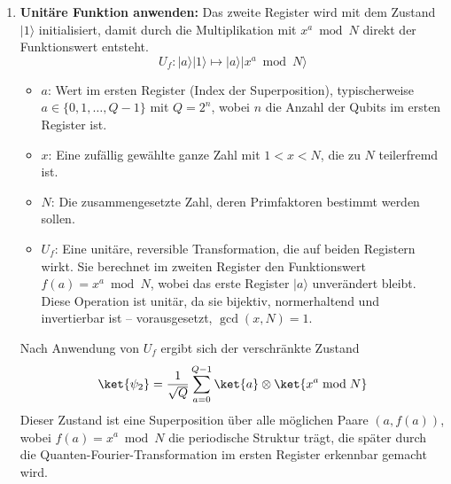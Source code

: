 {\begin{enumerate}
$$
\ket{\psi_1} = \frac{1}{\sqrt{Q}} \sum_{a=0}^{Q-1} \ket{a}
$$
Dabei ist:
  \begin{itemize}
    \item \( n \): Anzahl der Qubits im ersten Register.
    \item \( Q = 2^n \): Anzahl der möglichen Zustände im ersten Register
    \item \( a \): Laufvariable über alle Basiszustände von \( \ket{0} \) bis \( \ket{Q-1} \).
    \item \( 1 \): Anfangszustand des zweiten Registers, auf das später die modulare Exponentiation angewendet wird.
  \end{itemize}

  Durch die Hadamard-Gates wird das Register in eine Superposition gebracht, in der alle \( Q \) Basiszustände gleichwahrscheinlich sind. Diese Superposition ist notwendig, um später durch die Phaseninterferenz Information über die Periode der Funktion zu extrahieren.\\
 \item \textbf{Unitäre Funktion anwenden:} 
  Das zweite Register wird mit dem Zustand \( |1\rangle \) initialisiert, damit durch die Multiplikation mit \( x^a \bmod N \) direkt der Funktionswert entsteht.
\[
U_f \colon |a\rangle|1\rangle \mapsto |a\rangle|x^a \bmod N\rangle
\]
\begin{itemize}
    \item \textbf{\( a \)}: Wert im ersten Register (Index der Superposition), typischerweise \( a \in \{0, 1, \dotsc, Q-1\} \) mit \( Q = 2^n \), wobei \( n \) die Anzahl der Qubits im ersten Register ist.
    \item \textbf{\( x \)}: Eine zufällig gewählte ganze Zahl mit \( 1 < x < N \), die zu \( N \) teilerfremd ist.
    \item \textbf{\( N \)}: Die zusammengesetzte Zahl, deren Primfaktoren bestimmt werden sollen.
    \item \textbf{\( U_f \)}: Eine unitäre, reversible Transformation, die auf beiden Registern wirkt. Sie berechnet im zweiten Register den Funktionswert \( f(a) = x^a \bmod N \), wobei das erste Register \( |a\rangle \) unverändert bleibt. Diese Operation ist unitär, da sie bijektiv, normerhaltend und invertierbar ist – vorausgesetzt, \( \gcd(x, N) = 1 \).
\end{itemize}

Nach Anwendung von \( U_f \) ergibt sich der verschränkte Zustand
\[
\ket{\psi_2} = \frac{1}{\sqrt{Q}} \sum_{a=0}^{Q-1} \ket{a} \otimes \ket{x^a \bmod N}
\]
Dieser Zustand ist eine Superposition über alle möglichen Paare \( (a, f(a)) \), wobei \( f(a) = x^a \bmod N \) die periodische Struktur trägt, die später durch die Quanten-Fourier-Transformation im ersten Register erkennbar gemacht wird.\\


\end{enumerate}}
